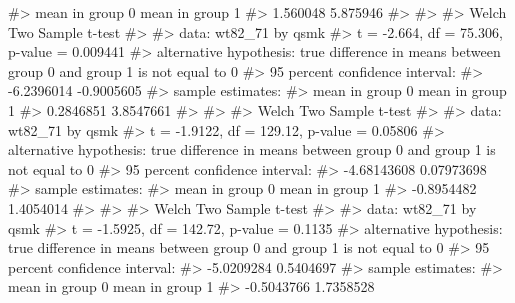 \documentclass[
  10pt,
  a4paper,
]{book}
\newenvironment{Shaded}{\begin{snugshade}}{\end{snugshade}}
\newcommand{\CommentTok}[1]{\textcolor[rgb]{0.37,0.37,0.37}{#1}}
\begin{document}
\begin{Shaded}
\begin{Highlighting}[]
\CommentTok{\#\textgreater{} mean in group 0 mean in group 1 }
\CommentTok{\#\textgreater{}        1.560048        5.875946 }
\CommentTok{\#\textgreater{} }
\CommentTok{\#\textgreater{} }
\CommentTok{\#\textgreater{}  Welch Two Sample t{-}test}
\CommentTok{\#\textgreater{} }
\CommentTok{\#\textgreater{} data:  wt82\_71 by qsmk}
\CommentTok{\#\textgreater{} t = {-}2.664, df = 75.306, p{-}value = 0.009441}
\CommentTok{\#\textgreater{} alternative hypothesis: true difference in means between group 0 and group 1 is not equal to 0}
\CommentTok{\#\textgreater{} 95 percent confidence interval:}
\CommentTok{\#\textgreater{}  {-}6.2396014 {-}0.9005605}
\CommentTok{\#\textgreater{} sample estimates:}
\CommentTok{\#\textgreater{} mean in group 0 mean in group 1 }
\CommentTok{\#\textgreater{}       0.2846851       3.8547661 }
\CommentTok{\#\textgreater{} }
\CommentTok{\#\textgreater{} }
\CommentTok{\#\textgreater{}  Welch Two Sample t{-}test}
\CommentTok{\#\textgreater{} }
\CommentTok{\#\textgreater{} data:  wt82\_71 by qsmk}
\CommentTok{\#\textgreater{} t = {-}1.9122, df = 129.12, p{-}value = 0.05806}
\CommentTok{\#\textgreater{} alternative hypothesis: true difference in means between group 0 and group 1 is not equal to 0}
\CommentTok{\#\textgreater{} 95 percent confidence interval:}
\CommentTok{\#\textgreater{}  {-}4.68143608  0.07973698}
\CommentTok{\#\textgreater{} sample estimates:}
\CommentTok{\#\textgreater{} mean in group 0 mean in group 1 }
\CommentTok{\#\textgreater{}      {-}0.8954482       1.4054014 }
\CommentTok{\#\textgreater{} }
\CommentTok{\#\textgreater{} }
\CommentTok{\#\textgreater{}  Welch Two Sample t{-}test}
\CommentTok{\#\textgreater{} }
\CommentTok{\#\textgreater{} data:  wt82\_71 by qsmk}
\CommentTok{\#\textgreater{} t = {-}1.5925, df = 142.72, p{-}value = 0.1135}
\CommentTok{\#\textgreater{} alternative hypothesis: true difference in means between group 0 and group 1 is not equal to 0}
\CommentTok{\#\textgreater{} 95 percent confidence interval:}
\CommentTok{\#\textgreater{}  {-}5.0209284  0.5404697}
\CommentTok{\#\textgreater{} sample estimates:}
\CommentTok{\#\textgreater{} mean in group 0 mean in group 1 }
\CommentTok{\#\textgreater{}      {-}0.5043766       1.7358528}


\end{Highlighting}
\end{Shaded}
\end{document}
